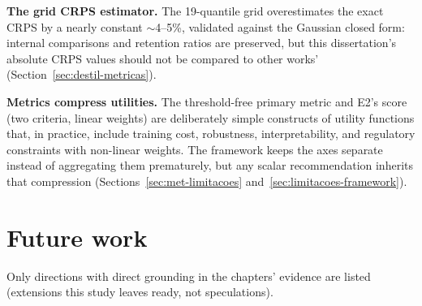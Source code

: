 \textbf{The grid CRPS estimator.} The 19-quantile grid
overestimates the exact CRPS by a nearly constant ${\sim}$4--5\%,
validated against the Gaussian closed form: internal comparisons
and retention ratios are preserved, but this dissertation's
absolute CRPS values should not be compared to other works'
(Section~\ref{sec:destil-metricas}).

\textbf{Metrics compress utilities.} The threshold-free primary
metric and E2's score (two criteria, linear weights) are
deliberately simple constructs of utility functions that, in
practice, include training cost, robustness, interpretability, and
regulatory constraints with non-linear weights. The framework keeps
the axes separate instead of aggregating them prematurely, but any
scalar recommendation inherits that compression
(Sections~\ref{sec:met-limitacoes}
and~\ref{sec:limitacoes-framework}).

\section{Future work}
\label{sec:conc-futuros}

Only directions with direct grounding in the chapters' evidence are
listed (extensions this study leaves ready, not speculations).

